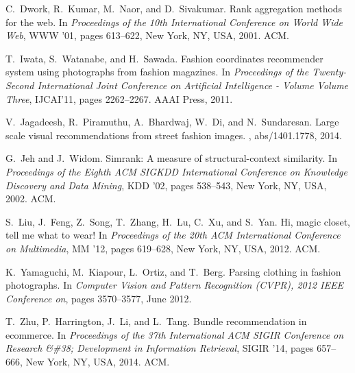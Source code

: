 \cleardoublepage
{}
{}



\begin{thebibliography}{1}

C.~Dwork, R.~Kumar, M.~Naor, and D.~Sivakumar.
\newblock Rank aggregation methods for the web.
\newblock In {\em Proceedings of the 10th International Conference on World
  Wide Web}, WWW '01, pages 613--622, New York, NY, USA, 2001. ACM.

T.~Iwata, S.~Watanabe, and H.~Sawada.
\newblock Fashion coordinates recommender system using photographs from fashion
  magazines.
\newblock In {\em Proceedings of the Twenty-Second International Joint
  Conference on Artificial Intelligence - Volume Volume Three}, IJCAI'11, pages
  2262--2267. AAAI Press, 2011.

V.~Jagadeesh, R.~Piramuthu, A.~Bhardwaj, W.~Di, and N.~Sundaresan.
\newblock Large scale visual recommendations from street fashion images.
, abs/1401.1778, 2014.

G.~Jeh and J.~Widom.
\newblock Simrank: A measure of structural-context similarity.
\newblock In {\em Proceedings of the Eighth ACM SIGKDD International Conference
  on Knowledge Discovery and Data Mining}, KDD '02, pages 538--543, New York,
  NY, USA, 2002. ACM.

S.~Liu, J.~Feng, Z.~Song, T.~Zhang, H.~Lu, C.~Xu, and S.~Yan.
\newblock Hi, magic closet, tell me what to wear!
\newblock In {\em Proceedings of the 20th ACM International Conference on
  Multimedia}, MM '12, pages 619--628, New York, NY, USA, 2012. ACM.

K.~Yamaguchi, M.~Kiapour, L.~Ortiz, and T.~Berg.
\newblock Parsing clothing in fashion photographs.
\newblock In {\em Computer Vision and Pattern Recognition (CVPR), 2012 IEEE
  Conference on}, pages 3570--3577, June 2012.

T.~Zhu, P.~Harrington, J.~Li, and L.~Tang.
\newblock Bundle recommendation in ecommerce.
\newblock In {\em Proceedings of the 37th International ACM SIGIR Conference on
  Research \&\#38; Development in Information Retrieval}, SIGIR '14, pages
  657--666, New York, NY, USA, 2014. ACM.

\end{thebibliography}




